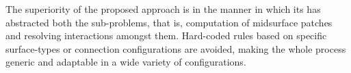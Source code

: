 \begin{center}
{\begin{tabular}[!htb]{@{}p{\myColWidthFactora\linewidth} p{\myColWidthFactora\linewidth}  p{\myColWidthFactora\linewidth}  p{\myColWidthFactora\linewidth} @{}}
\bottomrule
\end{tabular}
}
\label{tbl_fbcm}
\end{center}
	
The superiority of the proposed approach is in the manner in which its has abstracted both the sub-problems, that is, computation of midsurface patches and resolving interactions amongst them. Hard-coded rules based on specific surface-types or connection configurations are avoided, making the whole process generic and adaptable in a wide variety of configurations.

